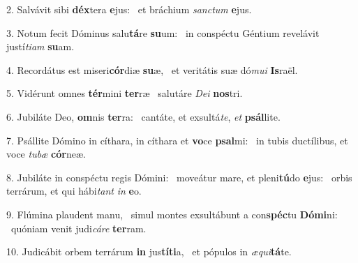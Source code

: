 2. Salvávit sibi \textbf{déx}tera \textbf{e}jus: \ast\  et bráchium \textit{sanc}\textit{tum} \textbf{e}jus.\

3. Notum fecit Dóminus salu\textbf{tá}re \textbf{su}um: \ast\  in conspéctu Géntium revelávit justí\textit{ti}\textit{am} \textbf{su}am.\

4. Recordátus est miseri\textbf{cór}diæ \textbf{su}æ, \ast\  et veritátis suæ dó\textit{mu}\textit{i} \textbf{Is}raël.\

5. Vidérunt omnes \textbf{tér}mini \textbf{ter}ræ \ast\  salutáre \textit{De}\textit{i} \textbf{nos}tri.\

6. Jubiláte Deo, \textbf{om}nis \textbf{ter}ra: \ast\  cantáte, et exsultá\textit{te}, \textit{et} \textbf{psál}lite.\

7. Psállite Dómino in cíthara, in cíthara et \textbf{vo}ce \textbf{psal}mi: \ast\  in tubis ductílibus, et voce \textit{tu}\textit{bæ} \textbf{cór}neæ.\

8. Jubiláte in conspéctu regis Dómini: \dag\  moveátur mare, et pleni\textbf{tú}do \textbf{e}jus: \ast\  orbis terrárum, et qui hábi\textit{tant} \textit{in} \textbf{e}o.\

9. Flúmina plaudent manu, \dag\  simul montes exsultábunt a con\textbf{spéc}tu \textbf{Dó}\textbf{mi}ni: \ast\  quóniam venit judi\textit{cá}\textit{re} \textbf{ter}ram.\

10. Judicábit orbem terrárum \textbf{in} jus\textbf{tí}\textbf{ti}a, \ast\  et pópulos in \textit{æ}\textit{qui}\textbf{tá}te.\

